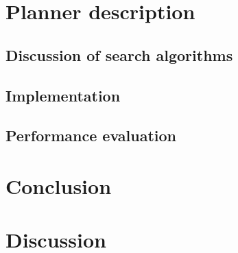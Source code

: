 \documentclass[final, english, a4paper]{article}
\begin{document}
\section{Planner description}
    
	\subsection{Discussion of search algorithms} %
		
	\subsection{Implementation}
	
	\subsection{Performance evaluation}
	
\section{Conclusion}
\section{Discussion}


\appendix
\end{document}
